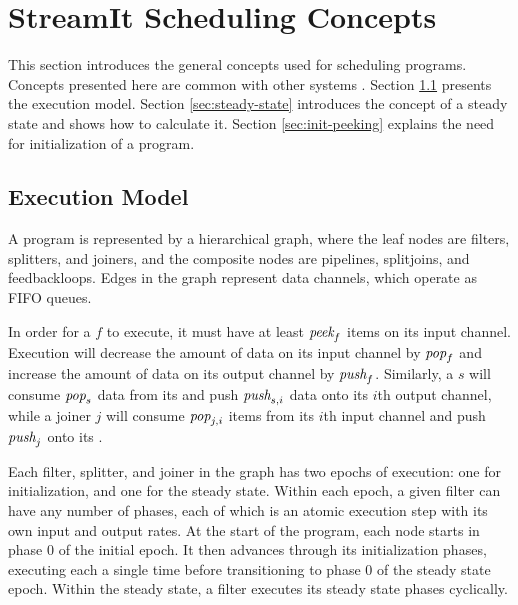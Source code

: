 \section{StreamIt Scheduling Concepts}
\label{chpt:sched-basic}

This section introduces the general concepts used for scheduling
{\StreamIt} programs.  Concepts presented here are common with other
systems \cite{ptolemyoverview}.  Section \ref{sec:exec-model} presents
the {\StreamIt} execution model. Section \ref{sec:steady-state}
introduces the concept of a steady state and shows how to calculate
it. Section \ref{sec:init-peeking} explains the need for
initialization of a {\StreamIt} program.

\subsection{{\StreamIt} Execution Model}
\label{sec:exec-model}

A {\StreamIt} program is represented by a hierarchical graph, where
the leaf nodes are filters, splitters, and joiners, and the composite
nodes are pipelines, splitjoins, and feedbackloops.  Edges in the
graph represent data channels, which operate as FIFO queues.

In order for a {\filter} $f$ to execute, it must have at least
$\mbox{\it peek}_f$ items on its input channel.  Execution will decrease the
amount of data on its input channel by $\mbox{\it pop}_f$ and increase the
amount of data on its output channel by $\mbox{\it push}_f$. Similarly, a
{\splitter} $s$ will consume $\mbox{\it pop}_s$ data from its {\Input}
{\Channel} and push $\mbox{\it push}_{s,i}$ data onto its $i$th output
channel, while a joiner $j$ will consume $\mbox{\it pop}_{j,i}$ items from
its $i$th input channel and push $\mbox{\it push}_j$ onto its {\Output}
{\Channel}.

Each filter, splitter, and joiner in the graph has two epochs of
execution: one for initialization, and one for the steady state.
Within each epoch, a given filter can have any number of phases, each
of which is an atomic execution step with its own input and output
rates.  At the start of the program, each node starts in phase $0$ of
the initial epoch.  It then advances through its initialization
phases, executing each a single time before transitioning to phase $0$
of the steady state epoch.  Within the steady state, a filter executes
its steady state phases cyclically.

